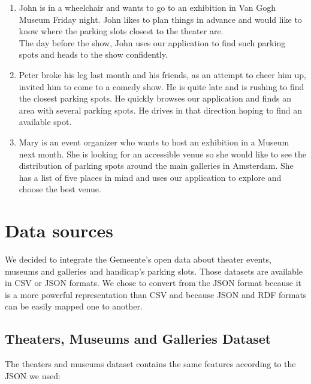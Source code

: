 \documentclass[runningheads,a4paper]{../../StyleFiles/llncs}
\begin{document}
\begin{enumerate}
	\item John is in a wheelchair and wants to go to an exhibition in Van Gogh Museum Friday night. John likes to plan things in advance and would like to know where the parking slots closest to the theater are. \\
	The day before the show, John uses our application to find such parking spots and heads to the show confidently. 
	\item Peter broke his leg last month and his friends, as an attempt to cheer him up, invited him to come to a comedy show. He is quite late and is rushing to find the closest parking spots. He quickly browses our application and finds an area with several parking spots. He drives in that direction hoping to find an available spot. 
	\item Mary is an event organizer who wants to host an exhibition in a Museum next month. She is looking for an accessible venue so she would like to see the distribution of parking spots around the main galleries in Amsterdam. She has a list of five places in mind and uses our application to explore and choose the best venue.
\end{enumerate}


\section{Data sources}
We decided to integrate the Gemeente's open data about theater events, museums and galleries and handicap's parking slots. Those datasets are available in CSV or JSON formats. We chose to convert from the JSON format because it is a more powerful representation than CSV and because JSON and RDF formats can be easily mapped one to another.

\subsection{Theaters, Museums and Galleries Dataset}
The theaters and museums dataset contains the same features according to the JSON we used:  
\end{document}
